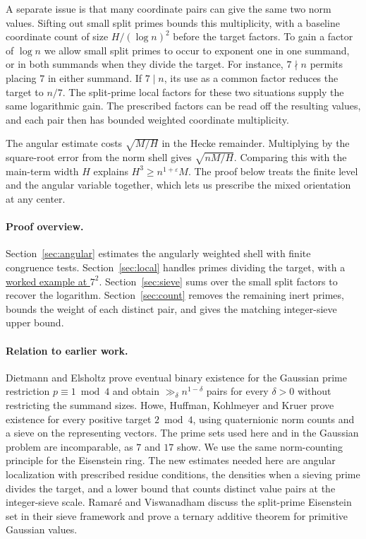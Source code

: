 A separate issue is that many coordinate pairs can give the same
two norm values. Sifting out small split primes bounds this
multiplicity, with a baseline coordinate count of size
\(H/(\log n)^2\) before the target factors. To gain a factor of \(\log n\)
we allow small split primes to occur to exponent one in one
summand, or in both summands when they divide the target.
For instance, \(7\nmid n\) permits placing \(7\) in either summand.
If \(7\mid n\), its use as a common factor reduces the target to
\(n/7\). The split-prime local factors for these two situations
supply the same logarithmic gain. The prescribed factors can
be read off the resulting values, and each pair then has bounded
weighted coordinate multiplicity.

The angular estimate costs \(\sqrt{M/H}\) in the Hecke remainder.
Multiplying by the square-root error from the norm shell gives
\(\sqrt{nM/H}\). Comparing this with the main-term width \(H\)
explains \(H^3\ge n^{1+\varepsilon}M\). The proof below treats
the finite level and the angular variable together, which lets
us prescribe the mixed orientation at any center.

\paragraph{Proof overview.}
Section~\ref{sec:angular} estimates the angularly weighted shell
with finite congruence tests. Section~\ref{sec:local} handles
primes dividing the target, with a \hyperref[sec:split-example]{worked example at \(7^2\)}.
Section~\ref{sec:sieve} sums over the small split factors to
recover the logarithm. Section~\ref{sec:count} removes the
remaining inert primes, bounds the weight of each distinct
pair, and gives the matching integer-sieve upper bound.

\paragraph{Relation to earlier work.}
Dietmann and Elsholtz \cite{DietmannElsholtz} prove eventual
binary existence for the Gaussian prime restriction \(p\equiv1\bmod4\)
and obtain \(\gg_\delta n^{1-\delta}\) pairs for every \(\delta>0\)
without restricting the summand sizes. Howe, Huffman, Kohlmeyer and
Kruer \cite[Theorem~1.1]{Euler} prove existence for every positive
target \(2\bmod4\), using quaternionic norm counts and a sieve on the
representing vectors. The prime sets used here and in the Gaussian
problem are incomparable, as \(7\) and \(17\) show.
We use the same norm-counting principle for the Eisenstein ring.
The new estimates needed here are angular localization with prescribed
residue conditions, the densities when a sieving prime divides the
target, and a lower bound that counts distinct value pairs at the
integer-sieve scale. Ramar\'e and Viswanadham
\cite[Introduction and Theorem~1.6]{RV} discuss the split-prime
Eisenstein set in their sieve framework and prove a ternary
additive theorem for primitive Gaussian values.

